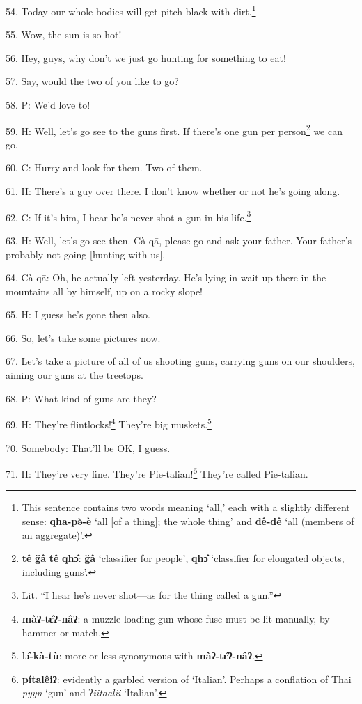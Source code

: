 54. Today our whole bodies will get pitch-black with dirt.\footnote{This sentence contains two words meaning `all,' each with a slightly different sense: \textbf{qha-pə̀-è} `all [of a thing]; the whole thing' and \textbf{dê-dê} `all (members of an aggregate)'.}

55. Wow, the sun is so hot!

56. Hey, guys, why don't we just go hunting for something to eat!

57. Say, would the two of you like to go?

58. P: We'd love to!

59. H: Well, let's go see to the guns first. If there's one gun per person\footnote{\textbf{tê} \textbf{g̈â} \textbf{tê} \textbf{qhɔ̂}: \textbf{g̈â} `classifier for people', \textbf{qhɔ̂} `classifier for elongated objects, including guns'.}
we can go.

60. C: Hurry and look for them. Two of them.

61. H: There's a guy over there. I don't know whether or not he's going along.

62. C: If it's him, I hear he's never shot a gun in his life.\footnote{Lit. ``I hear he's never shot---as for the thing called a gun.''}

63. H: Well, let's go see then. Cà-qā, please go and ask your father. Your father's
probably not going [hunting with us].

64. Cà-qā: Oh, he actually left yesterday. He's lying in wait up there in the
mountains all by himself, up on a rocky slope!

65. H: I guess he's gone then also.

66. So, let's take some pictures now.

67. Let's take a picture of all of us shooting guns, carrying guns on our shoulders,
aiming our guns at the treetops.

68. P: What kind of guns are they?

69. H: They're flintlocks!\footnote{\textbf{màʔ-tɛ̂ʔ-nâʔ}: a muzzle-loading gun whose fuse must be lit manually, by hammer or match.} They're big muskets.\footnote{\textbf{lɔ̂-kà-tù}: more or less synonymous with \textbf{màʔ-tɛ̂ʔ-nâʔ}.}

70. Somebody: That'll be OK, I guess.

71. H: They're very fine. They're Pie-talian!\footnote{\textbf{pítalêiʔ}: evidently a garbled version of `Italian'. Perhaps a conflation of Thai \textit{pyyn} `gun' and ʔ\textit{iitaalii} `Italian'.} They're called Pie-talian.

